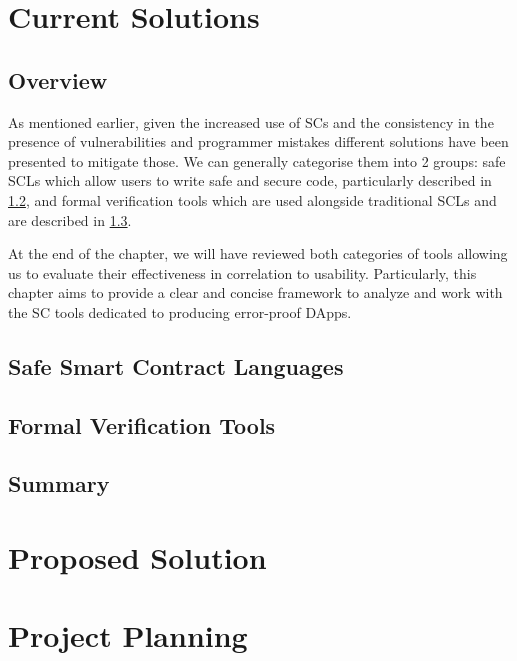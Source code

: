 \documentclass[oneside]{ecsproject}     %
\begin{document}
\chapter{Current Solutions}

\section{Overview}

As mentioned earlier, given the increased use of SCs and the consistency in the presence of vulnerabilities and programmer mistakes
different solutions have been presented to mitigate those. 
We can generally categorise them into 2 groups: safe SCLs which allow users to write safe and secure code, particularly described in \cref{Chapter:SCL}, 
and formal verification tools which are used alongside traditional SCLs and are described in \cref{Chapter:FVT}.

At the end of the chapter, we will have reviewed both categories of tools allowing us to evaluate their effectiveness in correlation to usability.
Particularly, this chapter aims to provide a clear and concise framework to analyze and work with the SC tools dedicated to producing
error-proof DApps. 
\section{Safe Smart Contract Languages} \label{Chapter:SCL}

\section{Formal Verification Tools} \label{Chapter:FVT}

\section{Summary}

\chapter{Proposed Solution} \label{Chapter:Solution}


\chapter{Project Planning}
\end{document}
